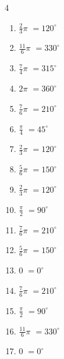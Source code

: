 \begin{multicols}{4}
\begin{enumerate}
  \item $\displaystyle \frac{2}{3}\pi$
        $\displaystyle =120^{\circ}$

\columnbreak %

  \item $\displaystyle \frac{11}{6}\pi$
        $\displaystyle =330^{\circ}$

  \item $\displaystyle \frac{7}{4}\pi$
        $\displaystyle =315^{\circ}$

  \item $\displaystyle 2\pi$
        $\displaystyle =360^{\circ}$

  \item $\displaystyle \frac{7}{6}\pi$
        $\displaystyle =210^{\circ}$

  \item $\displaystyle \frac{\pi}{4}$
        $\displaystyle =45^{\circ}$

  \item $\displaystyle \frac{2}{3}\pi$
        $\displaystyle =120^{\circ}$

  \item $\displaystyle \frac{5}{6}\pi$
        $\displaystyle =150^{\circ}$

  \item $\displaystyle \frac{2}{3}\pi$
        $\displaystyle =120^{\circ}$

  \item $\displaystyle \frac{\pi}{2}$
        $\displaystyle =90^{\circ}$

  \item $\displaystyle \frac{7}{6}\pi$
        $\displaystyle =210^{\circ}$

  \item $\displaystyle \frac{5}{6}\pi$
        $\displaystyle =150^{\circ}$

  \item $\displaystyle 0$
        $\displaystyle =0^{\circ}$

  \item $\displaystyle \frac{7}{6}\pi$
        $\displaystyle =210^{\circ}$

  \item $\displaystyle \frac{\pi}{2}$
        $\displaystyle =90^{\circ}$

  \item $\displaystyle \frac{11}{6}\pi$
        $\displaystyle =330^{\circ}$

  \item $\displaystyle 0$
        $\displaystyle =0^{\circ}$


\end{enumerate}
\end{multicols}
